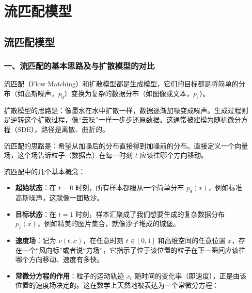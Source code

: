 \hypertarget{ux6d41ux5339ux914dux6a21ux578b}{%
\chapter{流匹配模型}\label{ux6d41ux5339ux914dux6a21ux578b}}

\hypertarget{ux6d41ux5339ux914dux6a21ux578b-1}{%
\section{流匹配模型}\label{ux6d41ux5339ux914dux6a21ux578b-1}}

\hypertarget{ux4e00ux6d41ux5339ux914dux7684ux57faux672cux601dux8defux53caux4e0eux6269ux6563ux6a21ux578bux7684ux5bf9ux6bd4}{%
\subsection{一、流匹配的基本思路及与扩散模型的对比}\label{ux4e00ux6d41ux5339ux914dux7684ux57faux672cux601dux8defux53caux4e0eux6269ux6563ux6a21ux578bux7684ux5bf9ux6bd4}}

流匹配（Flow Matching）和扩散模型都是生成模型，它们的目标都是将简单的分布（如高斯噪声，\(p_0\)）变换为复杂的数据分布（如图像或文本，\(p_1\)）。

扩散模型的思路是：像墨水在水中扩散一样，数据逐渐加噪变成噪声。生成过程则是逆转这个扩散过程，像``去噪''一样一步步还原数据。这通常被建模为随机微分方程（SDE），路径是离散、曲折的。

流匹配的思路是：希望从加噪后的分布直接得到加噪前的分布。直接定义一个向量场，这个场告诉粒子（数据点）在每一时刻 \(t\) 应该往哪个方向移动。

流匹配中的几个基本概念：

\begin{itemize}
\tightlist
\item
  \textbf{起始状态}：在 \(t=0\) 时刻，所有样本都服从一个简单分布 \(p_0(x)\)，例如标准高斯噪声，这就像一团散沙。
\item
  \textbf{目标状态}：在 \(t=1\) 时刻，样本汇聚成了我们想要生成的复杂数据分布 \(p_1(x)\)，例如精美的图片集合，就像沙子堆成的城堡。
\item
  \textbf{速度场}：记为 \(v(t,x)\)，在任意时刻 \(t\in[0,1]\) 和高维空间的任意位置 \(x\)，存在一个``风向标''或者说``力场''，它指示了位于该位置的粒子在下一瞬间应该往哪个方向移动、速度有多快。
\item
  \textbf{常微分方程的作用}：粒子的运动轨迹 \(x_t\) 随时间的变化率（即速度），正是由该位置的速度场决定的。这在数学上天然地被表达为一个常微分方程：
\end{itemize}

